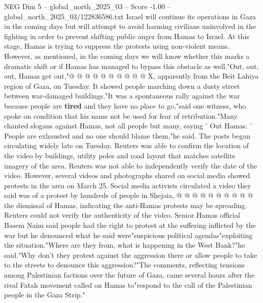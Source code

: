 \begin{textsample}{NEG Dim 5 – global\_north\_2025\_03 – Score -1.00 – global\_north\_2025\_03/122836586.txt}
Israel will continue its operations in Gaza in the coming days but will attempt to avoid harming civilians uninvolved in the fighting in order to prevent shifting public anger from Hamas to Israel.
At this stage, Hamas is trying to suppress the protests using non-violent means.
However, as mentioned, in the coming days we will know whether this marks a dramatic shift or if Hamas has managed to bypass this obstacle as well."Out, out, out, Hamas get out,"@ @ @ @ @ @ @ @ @ @ X, apparently from the Beit Lahiya region of Gaza, on Tuesday.
It showed people marching down a dusty street between war-damaged buildings."It was a spontaneous rally against the war because people are \textbf{tired} and they have no place to go,"said one witness, who spoke on condition that his name not be used for fear of retribution."Many chanted slogans against Hamas, not all people but many, saying ' Out Hamas. ' People are exhausted and no one should blame them,"he said.
The posts began circulating widely late on Tuesday.
Reuters was able to confirm the location of the video by buildings, utility poles and road layout that matches satellite imagery of the area.
Reuters was not able to independently verify the date of the video.
However, several videos and photographs shared on social media showed protests in the area on March 25.
Social media activists circulated a video they said was of a protest by hundreds of people in Shejaia, @ @ @ @ @ @ @ @ @ @ the dismissal of Hamas, indicating the anti-Hamas protests may be spreading.
Reuters could not verify the authenticity of the video.
Senior Hamas official Basem Naim said people had the right to protest at the suffering inflicted by the war but he denounced what he said were"suspicious political agendas"exploiting the situation."Where are they from, what is happening in the West Bank?"he said."Why don't they protest against the aggression there or allow people to take to the streets to denounce this aggression?"The comments, reflecting tensions among Palestinian factions over the future of Gaza, came several hours after the rival Fatah movement called on Hamas to"respond to the call of the Palestinian people in the Gaza Strip."

\end{textsample}
